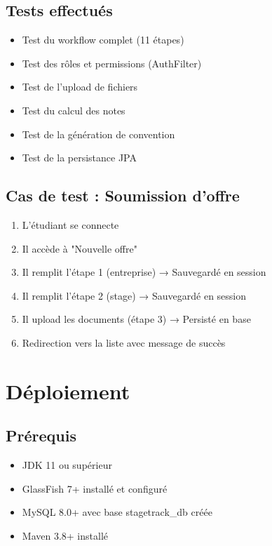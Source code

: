 \documentclass[12pt,a4paper]{report}
\begin{document}
\section{Tests effectués}
\begin{itemize}
    \item Test du workflow complet (11 étapes)
    \item Test des rôles et permissions (AuthFilter)
    \item Test de l'upload de fichiers
    \item Test du calcul des notes
    \item Test de la génération de convention
    \item Test de la persistance JPA
\end{itemize}

\section{Cas de test : Soumission d'offre}
\begin{enumerate}
    \item L'étudiant se connecte
    \item Il accède à "Nouvelle offre"
    \item Il remplit l'étape 1 (entreprise) → Sauvegardé en session
    \item Il remplit l'étape 2 (stage) → Sauvegardé en session
    \item Il upload les documents (étape 3) → Persisté en base
    \item Redirection vers la liste avec message de succès
\end{enumerate}

\chapter{Déploiement}

\section{Prérequis}
\begin{itemize}
    \item JDK 11 ou supérieur
    \item GlassFish 7+ installé et configuré
    \item MySQL 8.0+ avec base stagetrack\_db créée
    \item Maven 3.8+ installé
\end{itemize}
\end{document}
